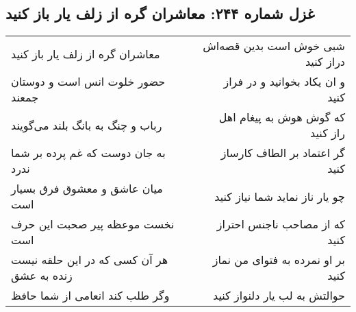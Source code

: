 \begin{center}
\section*{غزل شماره ۲۴۴: معاشران گره از زلف یار باز کنید}
\label{sec:sh244}
\begin{longtable}{l p{0.5cm} r}
معاشران گره از زلف یار باز کنید
&&
شبی خوش است بدین قصه‌اش دراز کنید
\\
حضور خلوت انس است و دوستان جمعند
&&
و ان یکاد بخوانید و در فراز کنید
\\
رباب و چنگ به بانگ بلند می‌گویند
&&
که گوش هوش به پیغام اهل راز کنید
\\
به جان دوست که غم پرده بر شما ندرد
&&
گر اعتماد بر الطاف کارساز کنید
\\
میان عاشق و معشوق فرق بسیار است
&&
چو یار ناز نماید شما نیاز کنید
\\
نخست موعظه پیر صحبت این حرف است
&&
که از مصاحب ناجنس احتراز کنید
\\
هر آن کسی که در این حلقه نیست زنده به عشق
&&
بر او نمرده به فتوای من نماز کنید
\\
وگر طلب کند انعامی از شما حافظ
&&
حوالتش به لب یار دلنواز کنید
\\
\end{longtable}
\end{center}
